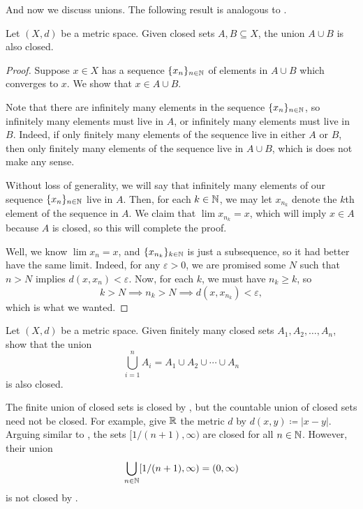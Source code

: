 \documentclass[../main.tex]{subfiles}
\begin{document}
And now we discuss unions. The following result is analogous to .
\begin{proposition} \label{prop:closed-union}
    Let $(X,d)$ be a metric space. Given closed sets $A,B\subseteq X$, the union $A\cup B$ is also closed.
\end{proposition}
\begin{proof}
    Suppose $x\in X$ has a sequence $\{x_n\}_{n\in\mathbb N}$ of elements in $A\cup B$ which converges to $x$. We show that $x\in A\cup B$.

    Note that there are infinitely many elements in the sequence $\{x_n\}_{n\in\mathbb N}$, so infinitely many elements must live in $A$, or infinitely many elements must live in $B$. Indeed, if only finitely many elements of the sequence live in either $A$ or $B$, then only finitely many elements of the sequence live in $A\cup B$, which is does not make any sense.

    Without loss of generality, we will say that infinitely many elements of our sequence $\{x_n\}_{n\in\mathbb N}$ live in $A$. Then, for each $k\in\mathbb N$, we may let $x_{n_k}$ denote the $k$th element of the sequence in $A$. We claim that $\lim x_{n_k}=x$, which will imply $x\in A$ because $A$ is closed, so this will complete the proof.

    Well, we know $\lim x_n=x$, and $\{x_{n_k}\}_{k\in\mathbb N}$ is just a subsequence, so it had better have the same limit. Indeed, for any $\varepsilon>0$, we are promised some $N$ such that $n>N$ implies $d(x,x_n)<\varepsilon$. Now, for each $k$, we must have $n_k\ge k$, so
    \[k>N\implies n_k>N\implies d(x,x_{n_k})<\varepsilon,\]
    which is what we wanted.
\end{proof}
\begin{exe} \label{exe:fin-intersection-closed}
    Let $(X,d)$ be a metric space. Given finitely many closed sets $A_1,A_2,\ldots,A_n$, show that the union
    \[\bigcup_{i=1}^nA_i=A_1\cup A_2\cup\cdots\cup A_n\]
    is also closed.
\end{exe}
\begin{nex}
    The finite union of closed sets is closed by , but the countable union of closed sets need not be closed. For example, give $\mathbb R$ the metric $d$ by $d(x,y)\coloneqq|x-y|$. Arguing similar to , the sets $[1/(n+1),\infty)$ are closed for all $n\in\mathbb N$. However, their union
    \[\bigcup_{n\in\mathbb N}[1/(n+1),\infty)=(0,\infty)\]
    is not closed by .
\end{nex}
\end{document}
